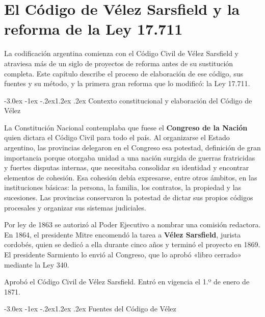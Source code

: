 \documentclass[12pt,oneside]{book}
\makeatletter
\renewcommand\section{\@startsection{section}{1}{\z@}%
  {-3.0ex \@plus -1ex \@minus -.2ex}{1.2ex \@plus .2ex}%
  {\normalfont\large\bfseries\color{acento}}}
\makeatother
\begin{document}

\chapter{El Código de Vélez Sarsfield y la reforma de la Ley 17.711}
\label{cap:velez}

La codificación argentina comienza con el Código Civil de Vélez Sarsfield y atraviesa más de un siglo de proyectos de reforma antes de su sustitución completa. Este capítulo describe el proceso de elaboración de ese código, sus fuentes y su método, y la primera gran reforma que lo modificó: la Ley 17.711.

\section{Contexto constitucional y elaboración del Código de Vélez}

La Constitución Nacional contemplaba que fuese el \textbf{Congreso de la Nación} quien dictara el Código Civil para todo el país. Al organizarse el Estado argentino, las provincias delegaron en el Congreso esa potestad, definición de gran importancia porque otorgaba unidad a una nación surgida de guerras fratricidas y fuertes disputas internas, que necesitaba consolidar su identidad y encontrar elementos de cohesión. Esa cohesión debía expresarse, entre otros ámbitos, en las instituciones básicas: la persona, la familia, los contratos, la propiedad y las sucesiones. Las provincias conservaron la potestad de dictar sus propios códigos procesales y organizar sus sistemas judiciales.

Por ley de 1863 se autorizó al Poder Ejecutivo a nombrar una comisión redactora. En 1864, el presidente Mitre encomendó la tarea a \textbf{Vélez Sarsfield}, jurista cordobés, quien se dedicó a ella durante cinco años y terminó el proyecto en 1869. El presidente Sarmiento lo envió al Congreso, que lo aprobó «libro cerrado» mediante la Ley 340.

\begin{importante}[Ley 340 (1869)]
Aprobó el Código Civil de Vélez Sarsfield. Entró en vigencia el 1.º de enero de 1871.
\end{importante}

\section{Fuentes del Código de Vélez}
\end{document}
